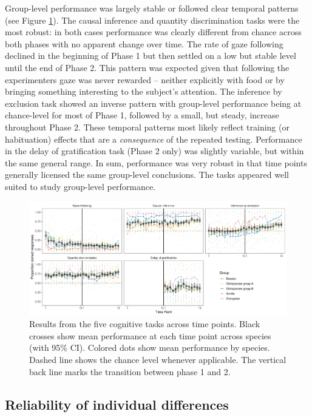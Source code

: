 \documentclass[
  man,floatsintext]{apa6}
\begin{document}
Group-level performance was largely stable or followed clear temporal patterns (see Figure \ref{fig:perfplot}). The causal inference and quantity discrimination tasks were the most robust: in both cases performance was clearly different from chance across both phases with no apparent change over time. The rate of gaze following declined in the beginning of Phase 1 but then settled on a low but stable level until the end of Phase 2. This pattern was expected given that following the experimenters gaze was never rewarded -- neither explicitly with food or by bringing something interesting to the subject's attention. The inference by exclusion task showed an inverse pattern with group-level performance being at chance-level for most of Phase 1, followed by a small, but steady, increase throughout Phase 2. These temporal patterns most likely reflect training (or habituation) effects that are a \emph{consequence} of the repeated testing. Performance in the delay of gratification task (Phase 2 only) was slightly variable, but within the same general range. In sum, performance was very robust in that time points generally licensed the same group-level conclusions. The tasks appeared well suited to study group-level performance.

\begin{figure}
\includegraphics[width=1\linewidth]{./figures/performance} \caption{Results from the five cognitive tasks across time points. Black crosses show mean performance at each time point across species (with 95\% CI). Colored dots show mean performance by species. Dashed line shows the chance level whenever applicable. The vertical back line marks the transition between phase 1 and 2.}\label{fig:perfplot}
\end{figure}

\hypertarget{reliability-of-individual-differences}{%
\subsection{Reliability of individual differences}\label{reliability-of-individual-differences}}
\end{document}

